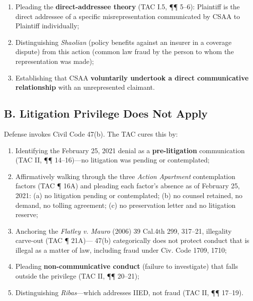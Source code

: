 \begin{enumerate}
\def\labelenumi{\arabic{enumi}.}
\tightlist
\item
  Pleading the \textbf{direct-addressee theory} (TAC \textsection{}I.5, ¶¶ 5--6): Plaintiff is the direct addressee of a specific misrepresentation communicated by CSAA to Plaintiff individually;
\item
  Distinguishing \emph{Shaolian} (policy benefits against an insurer in a coverage dispute) from this action (common law fraud by the person to whom the representation was made);
\item
  Establishing that CSAA \textbf{voluntarily undertook a direct communicative relationship} with an unrepresented claimant.
\end{enumerate}

\subsection{B. Litigation Privilege Does Not Apply}\label{b.-litigation-privilege-does-not-apply}

Defense invokes Civil Code \textsection{} 47(b). The TAC cures this by:

\begin{enumerate}
\def\labelenumi{\arabic{enumi}.}
\tightlist
\item
  Identifying the February 25, 2021 denial as a \textbf{pre-litigation} communication (TAC \textsection{}II, ¶¶ 14--16)---no litigation was pending or contemplated;
\item
  Affirmatively walking through the three \emph{Action Apartment} contemplation factors (TAC ¶ 16A) and pleading each factor's absence as of February 25, 2021: (a) no litigation pending or contemplated; (b) no counsel retained, no demand, no tolling agreement; (c) no preservation letter and no litigation reserve;
\item
  Anchoring the \emph{Flatley v. Mauro} (2006) 39 Cal.4th 299, 317--21, illegality carve-out (TAC ¶ 21A)---\textsection{} 47(b) categorically does not protect conduct that is illegal as a matter of law, including fraud under Civ. Code \textsection{}\textsection{} 1709, 1710;
\item
  Pleading \textbf{non-communicative conduct} (failure to investigate) that falls outside the privilege (TAC \textsection{}II, ¶¶ 20--21);
\item
  Distinguishing \emph{Ribas}---which addresses IIED, not fraud (TAC \textsection{}II, ¶¶ 17--19).
\end{enumerate}

